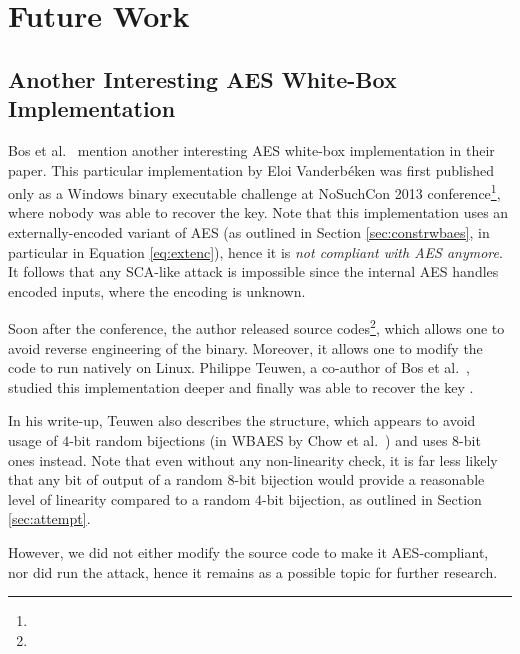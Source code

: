 \chapter{Future Work}
\label{chap:future}

\section{Another Interesting AES White-Box Implementation}
\label{sec:magicimpl}

Bos et al.\ \cite{bos2015differential} mention another interesting AES white-box implementation in their paper. This particular implementation by Eloi Vanderbéken was first published only as a Windows binary executable challenge at NoSuchCon 2013 conference\footnote{}, where nobody was able to recover the key. Note that this implementation uses an externally-encoded variant of AES (as outlined in Section \ref{sec:constrwbaes}, in particular in Equation \ref{eq:extenc}), hence it is {\em not compliant with AES anymore}. It follows that any SCA-like attack is impossible since the internal AES handles encoded inputs, where the encoding is unknown.

Soon after the conference, the author released source codes\footnote{}, which allows one to avoid reverse engineering of the binary. Moreover, it allows one to modify the code to run natively on Linux. Philippe Teuwen, a co-author of Bos et al.\ \cite{bos2015differential}, studied this implementation deeper and finally was able to recover the key \cite{teuwen2015nscwriteups}.

In his write-up, Teuwen also describes the structure, which appears to avoid usage of $4$-bit random bijections (in WBAES by Chow et al.\ \cite{chow2002aes}) and uses $8$-bit ones instead. Note that even without any non-linearity check, it is far less likely that any bit of output of a random $8$-bit bijection would provide a reasonable level of linearity compared to a random $4$-bit bijection, as outlined in Section \ref{sec:attempt}.

However, we did not either modify the source code to make it AES-compliant, nor did run the attack, hence it remains as a possible topic for further research.

